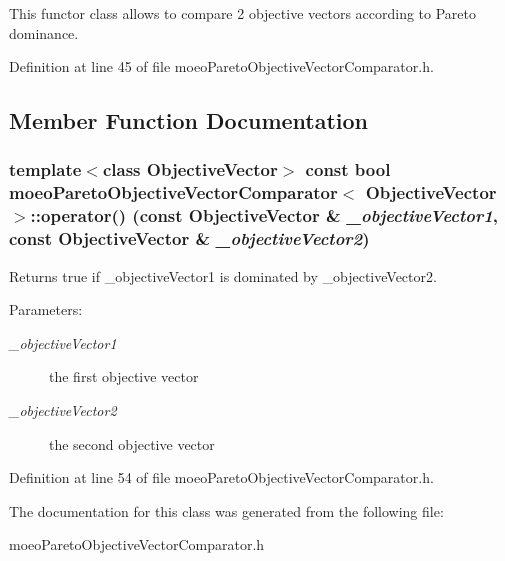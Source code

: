 This functor class allows to compare 2 objective vectors according to Pareto dominance. 



Definition at line 45 of file moeo\-Pareto\-Objective\-Vector\-Comparator.h.

\subsection{Member Function Documentation}
\subsubsection{\setlength{\rightskip}{0pt plus 5cm}template$<$class Objective\-Vector$>$ const bool \bf{moeo\-Pareto\-Objective\-Vector\-Comparator}$<$ Objective\-Vector $>$::operator() (const Objective\-Vector \& {\em \_\-objective\-Vector1}, const Objective\-Vector \& {\em \_\-objective\-Vector2})\hspace{0.3cm}{\tt  [inline]}}\label{classmoeoParetoObjectiveVectorComparator_9bd4302396fb179efe14035dc097726c}


Returns true if \_\-objective\-Vector1 is dominated by \_\-objective\-Vector2. 

\begin{Desc}
\item[Parameters:]
\begin{description}
\item[{\em \_\-objective\-Vector1}]the first objective vector \item[{\em \_\-objective\-Vector2}]the second objective vector \end{description}
\end{Desc}


Definition at line 54 of file moeo\-Pareto\-Objective\-Vector\-Comparator.h.

The documentation for this class was generated from the following file:\begin{CompactItemize}
\item 
moeo\-Pareto\-Objective\-Vector\-Comparator.h\end{CompactItemize}
